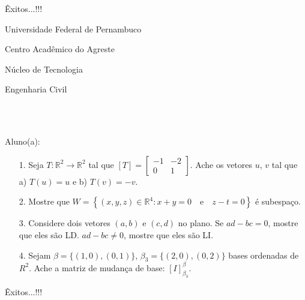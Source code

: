\documentclass[oneside,a4paper,12pt]{article}
\newcommand{\universidade}{Universidade Federal de Pernambuco}
\newcommand{\centro}{Centro Acadêmico do Agreste}
\newcommand{\departamento}{Núcleo de Tecnologia}
\newcommand{\curso}{Engenharia Civil}
\begin{document}
	\flushbottom
	\flushright
     Êxitos...!!!
  \vspace{12pt}
  
     \begin{center}
     	\vspace{50pt}
     	
     	\universidade
     	\par
     	\centro
     	\par
     	\departamento
     	\par
     	\curso
     	\par
     	\vspace{08pt}
     	\\ \\
     \end{center}
     
     \begin{flushleft}
     	Aluno(a):
     \end{flushleft}
 
 \begin{itemize}
 	\item[1.] Seja $T:\mathbb{R}^2\longrightarrow \mathbb{R}^2$ tal que $[T]=\begin{bmatrix}
 	-1& -2 \\
 	0& 1
 	\end{bmatrix}$. Ache os vetores $u$, $v$ tal que a) $T(u)=u$ e b) $T(v)=-v$.
 \end{itemize}
 \begin{itemize}
 	\item[2.] Mostre que $W=\left\lbrace (x,y,z)\in \mathbb{R}^{4}: x+y=0 \quad \text{e} \quad z-t=0\right\rbrace $ é subespaço.
 \end{itemize}
 \begin{itemize}
 	\item [3.] Considere dois vetores $(a,b)$ e $(c,d)$ no plano. Se $ad-bc=0$, mostre que eles são LD. $ad-bc\neq0$, mostre que eles são LI.
 \end{itemize}
 \begin{itemize}
 	\item[4.] Sejam $\beta=\{(1,0),(0,1)\}$, $\beta_{3}=\{(2,0), (0,2)\}$ bases ordenadas de $R^{2}$. Ache a matriz de mudança de base: $[I]_{\beta_{3}}^{\beta}$.
 	
 \end{itemize}
\flushbottom
\flushright
Êxitos...!!!
\end{document}
